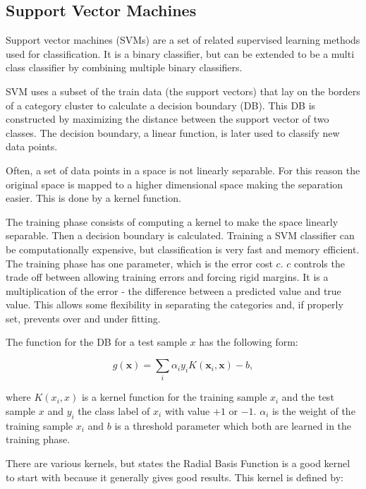 \subsection*{Support Vector Machines}

Support vector machines (SVMs) are a set of related supervised learning methods used for classification. It is a binary classifier, but can be extended to be a multi class classifier by combining multiple binary classifiers. 

SVM uses a subset of the train data (the support vectors) that lay on the borders of a category cluster to calculate a decision boundary (DB). This DB is constructed by maximizing the distance between the support vector of two classes. The decision boundary, a linear function, is later used to classify new data points.

Often, a set of data points in a space is not linearly separable. For this reason the original space is mapped to a higher dimensional space making the separation easier. This is done by a kernel function.

The training phase consists of computing a kernel to make the space linearly separable. Then a decision boundary is calculated. Training a SVM classifier can be computationally expensive, but classification is very fast and memory efficient. The training phase has one parameter, which is the error cost $c$. $c$ controls the trade off between allowing training errors and forcing rigid margins. It is a multiplication of the error - the difference between a predicted value and true value. This allows some flexibility in separating the categories and, if properly set, prevents over and under fitting.

The function for the DB for a test sample $x$ has the following form:

\begin{equation}
	g(\mathbf{x}) = \sum_i{\alpha_i y_i K(\mathbf{x}_i,\mathbf{x}) -b},
\end{equation}

where $K(x_i,x)$ is a kernel function for the training sample $x_i$ and the test sample $x$ and $y_i$ the class label of $x_i$ with value $+1$ or $-1$. $\alpha_i$ is the weight of the training sample $x_i$ and $b$ is a threshold parameter which both are learned in the training phase.  

There are various kernels, but \citep{Hsu2003} states the Radial Basis Function is a good kernel to start with because it generally gives good results. This kernel is defined by:

